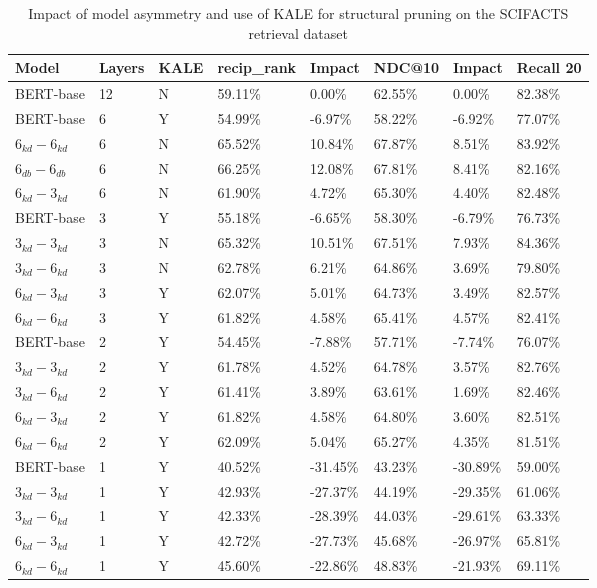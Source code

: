 \begin{table*}[!ht]
    \centering
    \begin{tabular}{|l|l|l|l|l|l|l|l|}
    \hline
        Model & Layers & KALE & recip\_rank & Impact & NDC@10 & Impact & Recall 20 \\ \hline
        BERT-base & 12 & N & 59.11\% & 0.00\% & 62.55\% & 0.00\% & 82.38\% \\ \hline
        BERT-base & 6 & Y & 54.99\% & -6.97\% & 58.22\% & -6.92\% & 77.07\% \\ \hline
        $6_{kd}-6_{kd}$ & 6 & N & 65.52\% & 10.84\% & 67.87\% & 8.51\% & 83.92\% \\ \hline
        $6_{db}-6_{db}$ & 6 & N & 66.25\% & 12.08\% & 67.81\% & 8.41\% & 82.16\% \\ \hline
        $6_{kd}-3_{kd}$ & 6 & N & 61.90\% & 4.72\% & 65.30\% & 4.40\% & 82.48\% \\ \hline
        BERT-base & 3 & Y & 55.18\% & -6.65\% & 58.30\% & -6.79\% & 76.73\% \\ \hline
        $3_{kd}-3_{kd}$ & 3 & N & 65.32\% & 10.51\% & 67.51\% & 7.93\% & 84.36\% \\ \hline
        $3_{kd}-6_{kd}$ & 3 & N & 62.78\% & 6.21\% & 64.86\% & 3.69\% & 79.80\% \\ \hline
        $6_{kd}-3_{kd}$ & 3 & Y & 62.07\% & 5.01\% & 64.73\% & 3.49\% & 82.57\% \\ \hline
        $6_{kd}-6_{kd}$ & 3 & Y & 61.82\% & 4.58\% & 65.41\% & 4.57\% & 82.41\% \\ \hline
        BERT-base & 2 & Y & 54.45\% & -7.88\% & 57.71\% & -7.74\% & 76.07\% \\ \hline
        $3_{kd}-3_{kd}$ & 2 & Y & 61.78\% & 4.52\% & 64.78\% & 3.57\% & 82.76\% \\ \hline
        $3_{kd}-6_{kd}$ & 2 & Y & 61.41\% & 3.89\% & 63.61\% & 1.69\% & 82.46\% \\ \hline
        $6_{kd}-3_{kd}$ & 2 & Y & 61.82\% & 4.58\% & 64.80\% & 3.60\% & 82.51\% \\ \hline
        $6_{kd}-6_{kd}$ & 2 & Y & 62.09\% & 5.04\% & 65.27\% & 4.35\% & 81.51\% \\ \hline
        BERT-base & 1 & Y & 40.52\% & -31.45\% & 43.23\% & -30.89\% & 59.00\% \\ \hline
        $3_{kd}-3_{kd}$ & 1 & Y & 42.93\% & -27.37\% & 44.19\% & -29.35\% & 61.06\% \\ \hline
        $3_{kd}-6_{kd}$ & 1 & Y & 42.33\% & -28.39\% & 44.03\% & -29.61\% & 63.33\% \\ \hline
        $6_{kd}-3_{kd}$ & 1 & Y & 42.72\% & -27.73\% & 45.68\% & -26.97\% & 65.81\% \\ \hline
        $6_{kd}-6_{kd}$ & 1 & Y & 45.60\% & -22.86\% & 48.83\% & -21.93\% & 69.11\% \\ \hline
    \end{tabular}
    \caption{Impact of model asymmetry and use of KALE for structural pruning on the SCIFACTS retrieval dataset}
    \label{tab:kale+asym-scifacts}
\end{table*}
